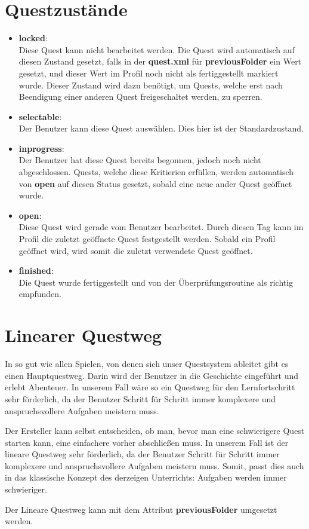 


\section{Questzustände}
\begin{itemize}
\item \textbf{locked}:\\ Diese Quest kann nicht bearbeitet werden. Die Quest wird automatisch auf diesen Zustand gesetzt, falls in der \textbf{quest.xml} für \textbf{previousFolder} ein Wert gesetzt, und dieser Wert im Profil noch nicht als fertiggestellt markiert wurde. Dieser Zustand wird dazu benötigt, um Quests, welche erst nach Beendigung einer anderen Quest freigeschaltet werden, zu sperren.
\item \textbf{selectable}:\\ Der Benutzer kann diese Quest auswählen. Dies hier ist der Standardzustand.
\item \textbf{inprogress}:\\ Der Benutzer hat diese Quest bereits begonnen, jedoch noch nicht abgeschlossen. Quests, welche diese Kritierien erfüllen, werden automatisch von \textbf{open} auf diesen Status gesetzt, sobald eine neue ander Quest geöffnet wurde.
\item \textbf{open}:\\ Diese Quest wird gerade vom Benutzer bearbeitet. Durch diesen Tag kann im Profil die zuletzt geöffnete Quest festgestellt werden. Sobald ein Profil geöffnet wird, wird somit die zuletzt verwendete Quest geöffnet.
\item \textbf{finished}:\\ Die Quest wurde fertiggestellt und von der Überprüfungsroutine als richtig empfunden.
\end{itemize}

\section{Linearer Questweg}
In so gut wie allen Spielen, von denen sich unser Questsystem ableitet gibt es einen Hauptquestweg. Darin wird der Benutzer in die Geschichte eingeführt und erlebt Abenteuer. In unserem Fall wäre so ein Questweg für den Lernfortschritt sehr förderlich, da der Benutzer Schritt für Schritt immer komplexere und anspruchsvollere Aufgaben meistern muss.

Der Ersteller kann selbst entscheiden, ob man, bevor man eine schwierigere Quest starten kann, eine einfachere vorher abschließen muss. In unserem Fall ist der lineare Questweg sehr förderlich, da der Benutzer Schritt für Schritt immer komplexere und anspruchsvollere Aufgaben meistern muss. Somit, passt dies auch in das klassische Konzept des derzeigen Unterrichts: Aufgaben werden immer schwieriger.

Der Lineare Questweg kann mit dem Attribut \textbf{previousFolder} umgesetzt werden.
